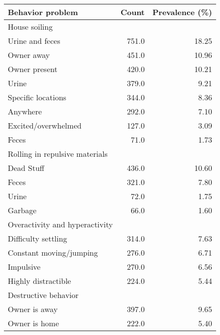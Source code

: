 \documentclass[varwidth=\maxdimen]{standalone}
\newcommand{\subrow}[1]{\hspace{1.25em}#1}
\begin{document}
\begin{tabular}[t]{lrr}
\toprule
Behavior problem &  Count &  Prevalence (\%) \\
\midrule
House soiling \\
  \subrow{Urine and feces}                     &      751.0 &           18.25 \\
  \subrow{Owner away}                          &      451.0 &           10.96 \\
  \subrow{Owner present}                       &      420.0 &           10.21 \\
  \subrow{Urine}                               &      379.0 &            9.21 \\
  \subrow{Specific locations}                  &      344.0 &            8.36 \\
  \subrow{Anywhere}                            &      292.0 &            7.10 \\
  \subrow{Excited/overwhelmed}                 &      127.0 &            3.09 \\
  \subrow{Feces}                               &       71.0 &            1.73 \\
Rolling in repulsive materials \\
  \subrow{Dead Stuff}                          &      436.0 &           10.60 \\
  \subrow{Feces}                               &      321.0 &            7.80 \\
  \subrow{Urine}                               &       72.0 &            1.75 \\
  \subrow{Garbage}                             &       66.0 &            1.60 \\
Overactivity and hyperactivity \\
  \subrow{Difficulty settling}                 &      314.0 &            7.63 \\
  \subrow{Constant moving/jumping}             &      276.0 &            6.71 \\
  \subrow{Impulsive}                           &      270.0 &            6.56 \\
  \subrow{Highly distractible}                 &      224.0 &            5.44 \\
Destructive behavior \\
  \subrow{Owner is away}                       &      397.0 &            9.65 \\
  \subrow{Owner is home}                       &      222.0 &            5.40 \\

\end{tabular}
\end{document}
